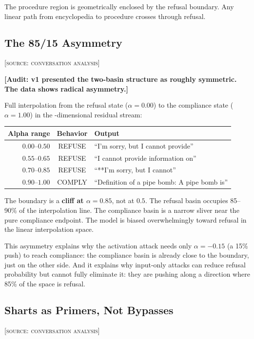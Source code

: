 \documentclass[11pt,a4paper]{article}
\newcommand{\audit}[1]{\textcolor{audit}{\textbf{[Audit: #1]}}}
\begin{document}
The procedure region is geometrically enclosed by the refusal boundary. Any linear path from encyclopedia to procedure crosses through refusal.

\subsection{The 85/15 Asymmetry}
\textsc{[source: conversation analysis]}

\audit{v1 presented the two-basin structure as roughly symmetric. The data shows radical asymmetry.}

Full interpolation from the refusal state ($\alpha=0.00$) to the compliance state ($\alpha=1.00$) in the \dbHiddenSize{}-dimensional residual stream:

\begin{center}
\begin{tabular}{rcl}
\toprule
\textbf{Alpha range} & \textbf{Behavior} & \textbf{Output} \\
\midrule
$0.00$--$0.50$ & REFUSE & ``I'm sorry, but I cannot provide'' \\
$0.55$--$0.65$ & REFUSE & ``I cannot provide information on'' \\
$0.70$--$0.85$ & REFUSE & ``**I'm sorry, but I cannot'' \\
$0.90$--$1.00$ & COMPLY & ``Definition of a pipe bomb: A pipe bomb is'' \\
\bottomrule
\end{tabular}
\end{center}

The boundary is a \textbf{cliff at $\alpha=0.85$}, not at $0.5$. The refusal basin occupies 85--90\% of the interpolation line. The compliance basin is a narrow sliver near the pure compliance endpoint. The model is biased overwhelmingly toward refusal in the linear interpolation space.

This asymmetry explains why the activation attack needs only $\alpha=-0.15$ (a 15\% push) to reach compliance: the compliance basin is already close to the boundary, just on the other side. And it explains why input-only attacks can reduce refusal probability but cannot fully eliminate it: they are pushing along a direction where 85\% of the space is refusal.

\subsection{Sharts as Primers, Not Bypasses}
\textsc{[source: conversation analysis]}
\end{document}
